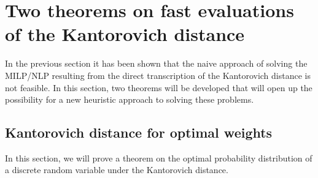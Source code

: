 \section{Two theorems on fast evaluations of the Kantorovich distance}
\label{sec:two-theorems}
In the previous section it has been shown that the naive approach of solving the MILP/NLP resulting from the direct transcription of the Kantorovich distance is not feasible.
In this section, two theorems will be developed that will open up the possibility for a new heuristic approach to solving these problems.
\subsection{Kantorovich distance for optimal weights}
\label{sec:optimal-weights-proof}
In this section, we will prove a theorem on the optimal probability distribution of a discrete random variable under the Kantorovich distance.

